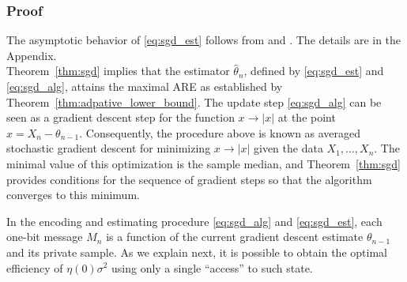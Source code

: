 \documentclass[letterpaper, 11pt]{IEEEtran}      %
\begin{document}
\subsubsection*{Proof}
The asymptotic behavior of \eqref{eq:sgd_est} follows from \cite[Thm. 4]{polyak1992acceleration} and \cite[Thm. 2]{polyak1990new}. The details are in the Appendix. \\

Theorem~\ref{thm:sgd} implies that the estimator $\hat{\theta}_n$, defined by \eqref{eq:sgd_est} and \eqref{eq:sgd_alg}, attains the maximal ARE as established by Theorem~\ref{thm:adpative_lower_bound}. The update step \eqref{eq:sgd_alg} can be seen as a gradient descent step for the function $x\to |x|$ at the point $x=X_n - \theta_{n-1}$. Consequently, the procedure above is known as averaged stochastic gradient descent for minimizing $x \to |x|$ given the data $X_1,\ldots,X_n$. The minimal value of this optimization is the sample median, and Theorem~\ref{thm:sgd} provides conditions for the sequence of gradient steps so that the algorithm converges to this minimum. 
 \par
In the encoding and estimating procedure \eqref{eq:sgd_alg} and \eqref{eq:sgd_est}, each one-bit message $M_n$ is a function of the current gradient descent estimate $\theta_{n-1}$ and its private sample. As we explain next, it is possible to obtain the optimal efficiency of $\eta(0)\sigma^2$ using only a single ``access'' to such state.  
\end{document}
